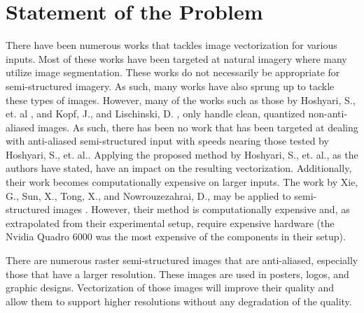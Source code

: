 \chapter{Statement of the Problem} 
\label{sec:ResearchQ}

There have been numerous works that tackles image vectorization for various inputs. Most of these works have been targeted at natural imagery where many utilize image segmentation. These works do not necessarily be appropriate for semi-structured imagery. As such, many works have also sprung up to tackle these types of images. However, many of the works such as those by Hoshyari, S., et. al \cite{hoshyari2018perceptiondriven}, and Kopf, J., and Lischinski, D. \cite{depixelizingpixelart}, only handle clean, quantized non-anti-aliased images. As such, there has been no work that has been targeted at dealing with anti-aliased semi-structured input with speeds nearing those tested by Hoshyari, S., et. al.. Applying the proposed method by Hoshyari, S., et. al., as the authors have stated, have an impact on the resulting vectorization. Additionally, their work becomes computationally expensive on larger inputs. The work by Xie, G., Sun, X., Tong, X., and Nowrouzezahrai, D., may be applied to semi-structured images \cite{hierarchicaldiffusioncurves}. However, their method is computationally expensive and, as extrapolated from their experimental setup, require expensive hardware (the Nvidia Quadro 6000 was the most expensive of the components in their setup).

There are numerous raster semi-structured images that are anti-aliased, especially those that have a larger resolution. These images are used in posters, logos, and graphic designs. Vectorization of those images will improve their quality and allow them to support higher resolutions without any degradation of the quality.
